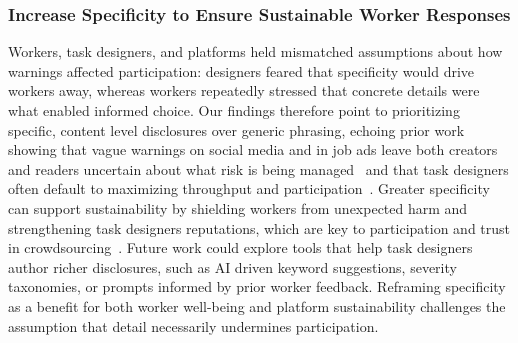 








\subsubsection{Increase Specificity to Ensure Sustainable Worker Responses}
Workers, task designers, and platforms held mismatched assumptions about how warnings affected participation: designers feared that specificity would drive workers away, whereas workers repeatedly stressed that concrete details were what enabled informed choice. Our findings therefore point to prioritizing specific, content level disclosures over generic phrasing, echoing prior work showing that vague warnings on social media and in job ads leave both creators and readers uncertain about what risk is being managed~\cite{Zhang2024PerceptionsTriggerWarnings, bridgland2024meta} and that task designers often default to maximizing throughput and participation~\cite{ho2015incentivizing}. Greater specificity can support sustainability by shielding workers from unexpected harm and strengthening task designers reputations, which are key to participation and trust in crowdsourcing~\cite{gaikwad2016boomerang, irani2013turkopticon}.  Future work could explore tools that help task designers author richer disclosures, such as AI driven keyword suggestions, severity taxonomies, or prompts informed by prior worker feedback. Reframing specificity as a benefit for both worker well-being and platform sustainability challenges the assumption that detail necessarily undermines participation.


